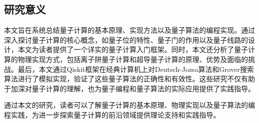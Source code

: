 \subsection{研究意义}
本文旨在系统总结量子计算的基本原理、实现方法以及量子算法的编程实现。通过深入探讨量子计算的核心概念，如量子位的特性、量子门的作用以及量子线路的设计，本文为读者提供了一个详实的量子计算入门框架。同时，本文还分析了量子计算的物理实现方式，包括离子阱量子计算和超导量子计算的原理、优势及面临的挑战。最后，本文通过Qiskit框架在经典计算机上对Deutsch-Jozsa算法和Grover搜索算法进行了模拟实现，验证了这些量子算法的正确性和有效性。这些研究不仅有助于加深对量子计算的理解，也为量子编程和量子算法的实际应用提供了实践指导。

通过本文的研究，读者可以了解量子计算的基本原理、物理实现以及量子算法的编程实践，为进一步探索量子计算的前沿领域提供理论支持和实践指导。
\thispagestyle{empty}
\setcounter{page}{0}